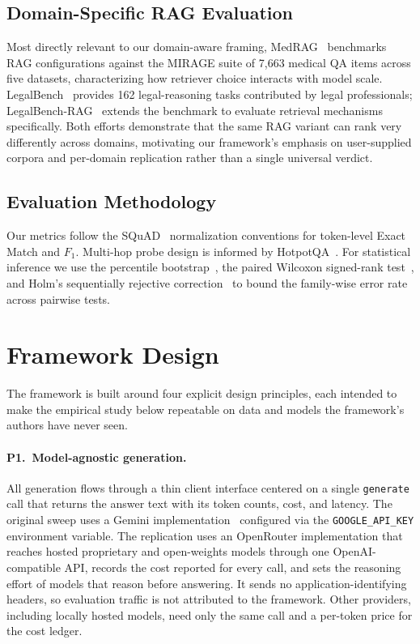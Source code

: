 \documentclass[conference,a4paper,10pt]{IEEEtran}
\begin{document}
\subsection{Domain-Specific RAG Evaluation}
Most directly relevant to our domain-aware framing, MedRAG~\cite{xiong2024medrag} benchmarks RAG configurations against the MIRAGE suite of 7{,}663 medical QA items across five datasets, characterizing how retriever choice interacts with model scale.
LegalBench~\cite{guha2023legalbench} provides 162 legal-reasoning tasks contributed by legal professionals; LegalBench-RAG~\cite{pipitone2024legalbenchrag} extends the benchmark to evaluate retrieval mechanisms specifically.
Both efforts demonstrate that the same RAG variant can rank very differently across domains, motivating our framework's emphasis on user-supplied corpora and per-domain replication rather than a single universal verdict.

\subsection{Evaluation Methodology}
Our metrics follow the SQuAD~\cite{rajpurkar2016squad} normalization conventions for token-level Exact Match and $F_1$.
Multi-hop probe design is informed by HotpotQA~\cite{yang2018hotpot}.
For statistical inference we use the percentile bootstrap~\cite{efron1979bootstrap}, the paired Wilcoxon signed-rank test~\cite{wilcoxon1945}, and Holm's sequentially rejective correction~\cite{holm1979} to bound the family-wise error rate across pairwise tests.

\section{Framework Design}
\label{sec:framework}

The framework is built around four explicit design principles, each intended to make the empirical study below repeatable on data and models the framework's authors have never seen.

\paragraph{P1.~Model-agnostic generation.}
All generation flows through a thin client interface centered on a single \texttt{generate} call that returns the answer text with its token counts, cost, and latency.
The original sweep uses a Gemini implementation~\cite{gemini2024} configured via the \texttt{GOOGLE\_API\_KEY} environment variable.
The replication uses an OpenRouter implementation that reaches hosted proprietary and open-weights models through one OpenAI-compatible API, records the cost reported for every call, and sets the reasoning effort of models that reason before answering.
It sends no application-identifying headers, so evaluation traffic is not attributed to the framework.
Other providers, including locally hosted models, need only the same call and a per-token price for the cost ledger.
\end{document}
